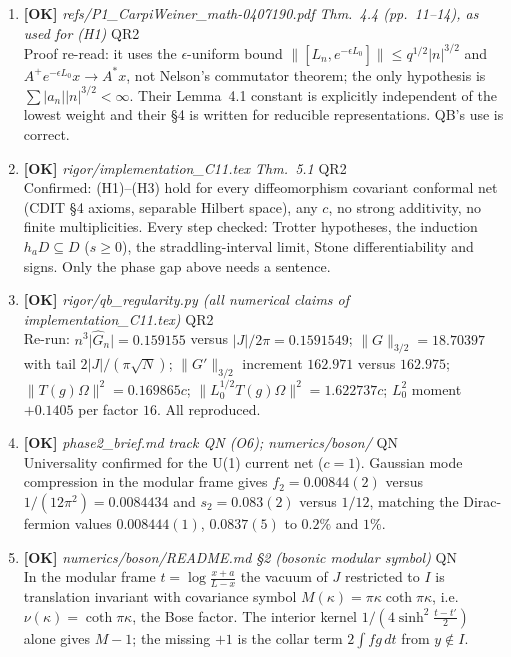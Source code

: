 \documentclass[11pt]{article}
\begin{document}
\begin{enumerate}[leftmargin=1.6em,itemsep=6pt]
\item \textbf{[OK]} \emph{refs/P1\_CarpiWeiner\_math-0407190.pdf Thm.~4.4 (pp.~11--14), as used for (H1)} \hfill\textsc{QR2}\\ Proof re-read: it uses the \(\epsilon\)-uniform bound \(\lVert[L_n,e^{-\epsilon L_0}]\rVert\le q^{1/2}\lvert n\rvert^{3/2}\) and \(A^+e^{-\epsilon L_0}x\to A^*x\), not Nelson's commutator theorem; the only hypothesis is \(\sum\lvert a_n\rvert\lvert n\rvert^{3/2}<\infty\). Their Lemma~4.1 constant is explicitly independent of the lowest weight and their \S4 is written for reducible representations. QB's use is correct.
\item \textbf{[OK]} \emph{rigor/implementation\_C11.tex Thm.~5.1} \hfill\textsc{QR2}\\ Confirmed: (H1)--(H3) hold for every diffeomorphism covariant conformal net (CDIT \S4 axioms, separable Hilbert space), any \(c\), no strong additivity, no finite multiplicities. Every step checked: Trotter hypotheses, the induction \(h_aD\subseteq D\) (\(s\ge0\)), the straddling-interval limit, Stone differentiability and signs. Only the phase gap above needs a sentence.
\item \textbf{[OK]} \emph{rigor/qb\_regularity.py (all numerical claims of implementation\_C11.tex)} \hfill\textsc{QR2}\\ Re-run: \(n^3\lvert\hat G_n\rvert=0.159155\) versus \(\lvert J\rvert/2\pi=0.1591549\); \(\lVert G\rVert_{3/2}=18.70397\) with tail \(2\lvert J\rvert/(\pi\sqrt N)\); \(\lVert G'\rVert_{3/2}\) increment \(162.971\) versus \(162.975\); \(\lVert T(g)\Omega\rVert^2=0.169865c\); \(\lVert L_0^{1/2}T(g)\Omega\rVert^2=1.622737c\); \(L_0^2\) moment \(+0.1405\) per factor \(16\). All reproduced.
\item \textbf{[OK]} \emph{phase2\_brief.md track QN (O6); numerics/boson/} \hfill\textsc{QN}\\ Universality confirmed for the U(1) current net (\(c=1\)). Gaussian mode compression in the modular frame gives \(f_2=0.00844(2)\) versus \(1/(12\pi^2)=0.0084434\) and \(s_2=0.083(2)\) versus \(1/12\), matching the Dirac-fermion values \(0.008444(1)\), \(0.0837(5)\) to \(0.2\%\) and \(1\%\).
\item \textbf{[OK]} \emph{numerics/boson/README.md \S2 (bosonic modular symbol)} \hfill\textsc{QN}\\ In the modular frame \(t=\log\frac{x+a}{L-x}\) the vacuum of \(J\) restricted to \(I\) is translation invariant with covariance symbol \(M(\kappa)=\pi\kappa\coth\pi\kappa\), i.e. \(\nu(\kappa)=\coth\pi\kappa\), the Bose factor. The interior kernel \(1/(4\sinh^2\frac{t-t'}2)\) alone gives \(M-1\); the missing \(+1\) is the collar term \(2\int f g\,dt\) from \(y\notin I\).

\end{enumerate}
\end{document}

